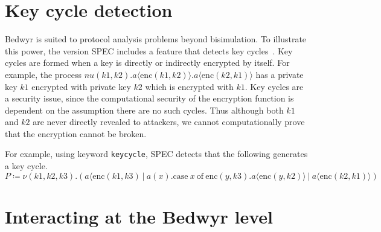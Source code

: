\documentclass{article}
\begin{document}
\section{Key cycle detection}
\label{sec:keycycle}
Bedwyr is suited to protocol analysis problems beyond bisimulation. To illustrate this power, the version SPEC includes a feature that detects key cycles~\cite{comon-lundh10tocl}.
Key cycles are formed when a key is directly or indirectly encrypted by itself.
For example, the process $nu(k1,k2).a\langle\mathrm{enc}(k1,k2)\rangle.a\langle \mathrm{enc}(k2,k1)\rangle$ 
has a private key $k1$ encrypted with private key $k2$ which is encrypted with $k1$.
Key cycles are a security issue, since the computational security of the encryption function is dependent on the assumption there are no such cycles.
Thus although both $k1$ and $k2$ are never directly revealed to attackers, we cannot computationally prove that the encryption cannot be broken.
 
For example, using keyword \texttt{keycycle}, SPEC detects that the following generates a key cycle.
\[
P \coloneqq
\nu(k1,k2,k3).(a\langle\mathrm{enc}(k1,k3) ~|~ a(x).\mathrm{case}~x~\mathrm{of}~\mathrm{enc}(y,k3).a\langle\mathrm{enc}(y,k2)\rangle ~|~ a\langle\mathrm{enc}(k2,k1)\rangle)
\]


\section{Interacting at the Bedwyr level}
\label{sec:bedwyr}

\end{document}
